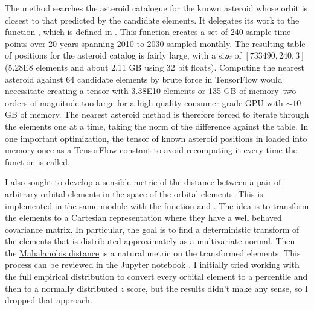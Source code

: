 The method  searches the asteroid catalogue for the known asteroid whose orbit is closest to that predicted by the candidate elements.
It delegates its work to the function , which is defined in .
This function creates a set of 240 sample time points over 20 years spanning 2010 to 2030 sampled monthly.
The resulting table of positions for the asteroid catalog is fairly large, with a size of $[733490, 240, 3]$ (5.28E8 elements and about 2.11 GB using 32 bit floats).
Computing the nearest asteroid against $64$ candidate elements by brute force in TensorFlow would necessitate creating a tensor with 3.38E10 elements
or 135 GB of memory--two orders of magnitude too large for a high quality consumer grade GPU with $\sim 10$ GB of memory.
The nearest asteroid method is therefore forced to iterate through the elements one at a time, taking the norm of the difference against the table.
In one important optimization, the tensor of known asteroid positions in loaded into memory 
once as a TensorFlow constant to avoid recomputing it every time the function is called.

I also sought to develop a sensible metric of the distance between a pair of arbitrary orbital elements in the space of the orbital elements.
This is implemented in the same module with the function  and .
The idea is to transform the elements to a Cartesian representation where they have a well behaved covariance matrix.
In particular, the goal is to find a deterministic transform of the elements that is distributed approximately as a multivariate normal.
Then the \href{https://en.wikipedia.org/wiki/Mahalanobis_distance}{Mahalanobis distance} is a natural metric on the transformed elements.
This process can be reviewed in the Jupyter notebook .
I initially tried working with the full empirical distribution to convert every orbital element to a percentile and then to a normally distributed $z$ score,
but the results didn't make any sense, so I dropped that approach.

